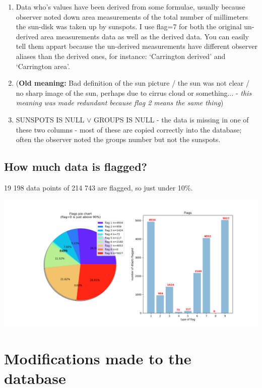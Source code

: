 \documentclass[12pt]{article}
\begin{document}
\begin{enumerate}[start=0]
    \item Data who's values have been derived from some formulae, usually because observer noted down area measurements of the total number of millimeters the sun-disk was taken up by sunspots. I use flag=7 for both the original un-derived area measurements data as well as the derived data. You can easily tell them appart because the un-derived measurements have different observer aliases than the derived ones, for instance: `Carrington derived' and `Carrington area'. 
    \item (\textbf{Old meaning:} Bad definition of the sun picture / the sun was not clear / no sharp image of the sun, perhaps due to cirrus cloud or something... - \textit{this meaning was made redundant because flag 2 means the same thing})
    \item SUNSPOTS IS NULL $\lor$ GROUPS IS NULL - the data is missing in one of these two columns - most of these are copied correctly into the database; often the observer noted the groups number but not the sunspots.
\end{enumerate}

\subsection{How much data is flagged?}

19 198 data points of 214 743 are flagged, so just under 10\%.

{\centering
\label{figure:flags number of}
\includegraphics[width=\linewidth]{pie-charts-3-flags.png}
\par}


\section{Modifications made to the database}
\end{document}
